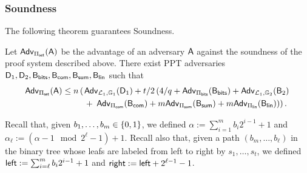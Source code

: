 \subsubsection{Soundness}

The following theorem guarantees Soundness. 
 
\begin{theorem} Let \(\mathsf{Adv}_{{\Pi_{\mathsf{set}}}}(\mathsf{A})\) 
be the advantage of an adversary \(\mathsf{A}\) against the soundness of 
the proof system  described above. There exist PPT adversaries
\(\mathsf{D}_1,\mathsf{D}_2,\mathsf{B}_{\mathsf{bits}},\mathsf{B}_{\mathsf{com}},\mathsf{B}_{\mathsf{sum}},\mathsf{B}_\mathsf{lin}\) such that 
\begin{align*}
\mathsf{Adv}_{{\Pi_{\mathsf{set}}}}(\mathsf{A}) \leq 
n \left(\right.
    &\mathsf{Adv}_{\mathcal{L}_1,\mathbb{G}_1}(\mathsf{D}_1) 
        + t /2\left(4/q
            +  \mathsf{Adv}_{\Pi_{\mathsf{bits}}}(\mathsf{B}_{\mathsf{bits}})
            +  \mathsf{Adv}_{\mathcal{L}_1,\mathbb{G}_2}(\mathsf{B}_2)\right. \\
    &+ \left.\left.\mathsf{Adv}_{{\Pi_{\mathsf{com}}}}(\mathsf{B}_{\mathsf{com}})
        + m\mathsf{Adv}_{{\Pi_{\mathsf{sum}}}}(\mathsf{B}_{\mathsf{sum}})
        + m\mathsf{Adv}_{{\Pi_\mathsf{lin}}}(\mathsf{B}_\mathsf{lin})\right)\right).
\end{align*}
\label{teo:bitstr-soundness}
\end{theorem}

Recall that, given $b_1,\ldots,b_m\in\{0,1\}$, we defined $\alpha:=\sum_{i=1}^mb_i2^{i-1}+1$ and $\alpha_\ell:=(\alpha-1\mod 2^\ell-1)+1$. Recall also that, given a path $(b_m,\ldots, b_\ell)$ in the binary tree whose leafs are labeled from left to right by $s_1,\ldots,s_t$, we defined ${\mathsf{left}}:=\sum_{i=\ell}^m b_i2^{i-1}+1$ and ${\mathsf{right}}:={\mathsf{left}}+2^{\ell-1}-1$.

